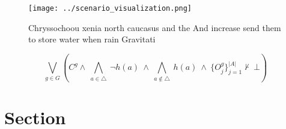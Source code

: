 \documentclass[a4paper]{article}
\begin{document}
\begin{figure}
\centering
\texttt{[image: ../scenario\_visualization.png]}
\caption{Chryssochoou xenia north caucasus and the And increase send them to store water when rain Gravitati
}
\end{figure}
 
\[\bigvee_{g\in G} (C^g \wedge\ \bigwedge_{a\in \triangle}\ \neg h(a)\ \wedge\ \bigwedge_{a\notin \triangle}\ h(a)\ \wedge\ \{O_j^g\}_{j=1}^{|A|} \nvdash\ \bot )\]

\section{Section}
\end{document}
